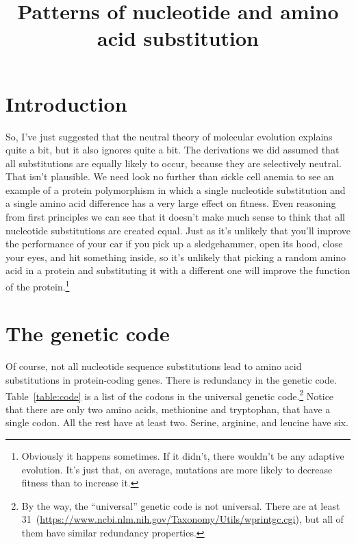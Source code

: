 \documentclass[12pt]{article}
\title{Patterns of nucleotide and amino acid substitution}
\begin{document}
\maketitle

\thispagestyle{first}

\section*{Introduction}

So, I've just suggested that the neutral theory of molecular evolution
explains quite a bit, but it also ignores quite a bit. The derivations
we did assumed that all substitutions are equally likely to occur,
because they are selectively neutral. That isn't plausible. We need
look no further than sickle cell anemia to see an example of a protein
polymorphism in which a single nucleotide substitution and a single
amino acid difference has a very large effect on fitness. Even
reasoning from first principles we can see that it doesn't make much
sense to think that all nucleotide substitutions are created
equal. Just as it's unlikely that you'll improve the performance of
your car if you pick up a sledgehammer, open its hood, close your
eyes, and hit something inside, so it's unlikely that picking a random
amino acid in a protein and substituting it with a different one will
improve the function of the protein.\footnote{Obviously it happens
  sometimes. If it didn't, there wouldn't be any adaptive
  evolution. It's just that, on average, mutations are more likely to
  decrease fitness than to increase it. }

\section*{The genetic code}

Of course, not all nucleotide sequence substitutions lead to amino
acid substitutions in protein-coding genes. There is redundancy in the
genetic code. Table~\ref{table:code} is a list of the codons in the
universal genetic code.\footnote{By the way, the ``universal'' genetic
  code is not universal. There are at least
  31~(\url{https://www.ncbi.nlm.nih.gov/Taxonomy/Utils/wprintgc.cgi}),
  but all of them have similar redundancy properties.} Notice that
there are only two amino acids, methionine and tryptophan, that have a
single codon. All the rest have at least two. Serine, arginine, and
leucine have six.
\end{document}
